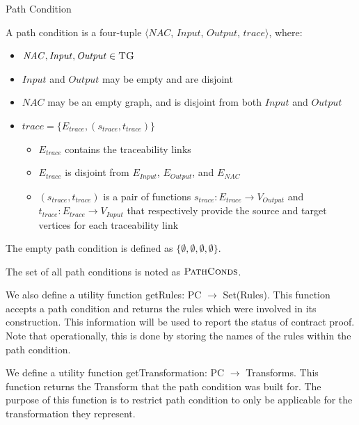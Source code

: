 


\begin{definition}{Path Condition\\}
\label{def:path_condition}

A path condition is a four-tuple $\big\langle \mathit{NAC}$, $\mathit{Input}$, $\mathit{Output}$, $\mathit{trace}\big\rangle$, where:

\begin{itemize}
\item $\mathit{NAC}, \mathit{Input}, \mathit{Output} \in \textsc{TG}$
\item $\mathit{Input}$ and $\mathit{Output} $ may be empty and are disjoint
\item $\mathit{NAC}$ may be an empty graph, and is disjoint from both $\mathit{Input}$ and $\mathit{Output} $
\item $\mathit{trace} = \{E_{trace}, (s_{trace}, t_{trace})\}$
\begin{itemize}
\item $E_{trace}$ contains the traceability links
\item $E_{trace} $ is disjoint from $E_{Input}$, $E_{Output}$, and $E_{NAC}$
\item $(s_{trace}, t_{trace})$ is a pair of functions $s_{trace}: E_{trace}\rightarrow V_{\textit{Output}}$ and $t_{trace}: E_{trace}\rightarrow V_{\textit{Input}}$ that respectively provide the source and target vertices for each traceability link
\end{itemize}

\end{itemize}  

The empty path condition is defined as $\{\emptyset, \emptyset, \emptyset, \emptyset \}$.

The set of all path conditions is noted as $\textsc{PathConds}$.

We also define a utility function getRules: PC $\rightarrow$ Set(Rules). This function accepts a path condition and returns the rules which were involved in its construction. This information will be used to report the status of contract proof. Note that operationally, this is done by storing the names of the rules within the path condition. 

We define a utility function getTransformation: PC $\rightarrow$ Transforms. This function returns the Transform that the path condition was built for. The purpose of this function is to restrict path condition to only be applicable for the transformation they represent.



\end{definition}


